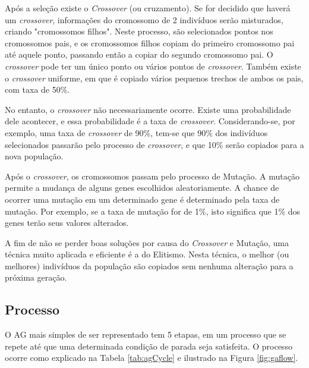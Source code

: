 \documentclass[
	12pt,					%
	openright,				%
	oneside,				%
	a4paper,				%
	bibjustif,				%
	chapter=TITLE,			%
	english,				%
	brazil,					%
	]{abntex2}
\begin{document}
	Após a seleção existe o \textit{Crossover} (ou cruzamento).
	Se for decidido que haverá um \textit{crossover},
	informações do cromossomo de 2 indivíduos serão misturados,
	criando "cromossomos filhos"{}.
	Neste processo, são selecionados pontos nos cromossomos pais,
	e os cromossomos filhos copiam do primeiro cromossomo pai até aquele ponto,
	passando então a copiar do segundo cromossomo pai.
	O \textit{crossover} pode ter um único ponto ou vários pontos de \textit{crossover}.
	Também existe o \textit{crossover} uniforme,
	em que é copiado vários pequenos trechos de ambos os pais,
	com taxa de 50\%.
	
	No entanto, o \textit{crossover} não necessariamente ocorre.
	Existe uma probabilidade dele acontecer,
	e essa probabilidade é a taxa de \textit{crossover}.
	Considerando-se, por exemplo, uma taxa de \textit{crossover} de 90\%,
	tem-se que 90\% dos indivíduos selecionados passarão pelo processo de \textit{crossover},
	e que 10\% serão copiados para a nova população.
	
	Após o \textit{crossover},
	os cromossomos passam pelo processo de Mutação.
	A mutação permite a mudança de alguns genes escolhidos aleatoriamente.
	A chance de ocorrer uma mutação em um determinado gene é determinado pela taxa de mutação.
	Por exemplo, se a taxa de mutação for de 1\%,
	isto significa que 1\% dos genes terão seus valores alterados.
	
	A fim de não se perder boas soluções por causa do \textit{Crossover} e Mutação,
	uma técnica muito aplicada e eficiente é a do Elitismo.
	Nesta técnica, o melhor (ou melhores) indivíduos da população são copiados sem nenhuma alteração para a próxima geração.
	
	\FloatBarrier
	\subsection{Processo} \label{ssec:processo}
	O AG mais simples de ser representado tem 5 etapas,
	em um processo que se repete até que uma determinada condição de parada seja satisfeita.
	O processo ocorre como explicado na Tabela \ref{tab:agCycle} e ilustrado na Figura \ref{fig:gaflow}.
	
\end{document}
